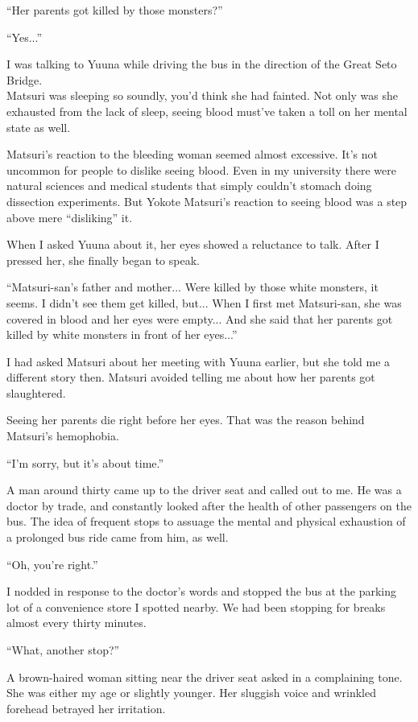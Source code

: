 ``Her parents got killed by those monsters?''

``Yes...''

I was talking to Yuuna while driving the bus in the direction of the Great Seto Bridge. \\
Matsuri was sleeping so soundly, you'd think she had fainted. Not only was she exhausted from the lack of sleep, seeing blood must've taken a toll on her mental state as well.

Matsuri's reaction to the bleeding woman seemed almost excessive. It's not uncommon for people to dislike seeing blood. Even in my university there were natural sciences and medical students that simply couldn't stomach doing dissection experiments. But Yokote Matsuri's reaction to seeing blood was a step above mere ``disliking'' it.

When I asked Yuuna about it, her eyes showed a reluctance to talk. After I pressed her, she finally began to speak.

``Matsuri-san's father and mother... Were killed by those white monsters, it seems. I didn't see them get killed, but... When I first met Matsuri-san, she was covered in blood and her eyes were empty... And she said that her parents got killed by white monsters in front of her eyes...''

I had asked Matsuri about her meeting with Yuuna earlier, but she told me a different story then. Matsuri avoided telling me about how her parents got slaughtered.

Seeing her parents die right before her eyes. That was the reason behind Matsuri's hemophobia.

``I'm sorry, but it's about time.''

A man around thirty came up to the driver seat and called out to me. He was a doctor by trade, and constantly looked after the health of other passengers on the bus. The idea of frequent stops to assuage the mental and physical exhaustion of a prolonged bus ride came from him, as well.

``Oh, you're right.''

I nodded in response to the doctor's words and stopped the bus at the parking lot of a convenience store I spotted nearby. We had been stopping for breaks almost every thirty minutes.

``What, another stop?''

A brown-haired woman sitting near the driver seat asked in a complaining tone. She was either my age or slightly younger. Her sluggish voice and wrinkled forehead betrayed her irritation.


